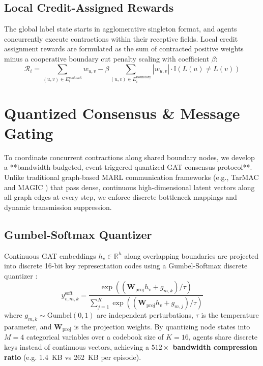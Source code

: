 \documentclass[10pt]{article}
\begin{document}
\subsection{Local Credit-Assigned Rewards}
The global label state starts in agglomerative singleton format, and agents concurrently execute contractions within their receptive fields. Local credit assignment rewards are formulated as the sum of contracted positive weights minus a cooperative boundary cut penalty scaling with coefficient $\beta$:
\begin{equation}
\mathcal{R}_i = \sum_{(u, v) \in E_i^{\text{contract}}} w_{u, v} - \beta \sum_{(u, v) \in E_i^{\text{boundary}}} |w_{u, v}| \cdot \mathbb{I}(L(u) \neq L(v))
\end{equation}

\section{Quantized Consensus \& Message Gating}
To coordinate concurrent contractions along shared boundary nodes, we develop a **bandwidth-budgeted, event-triggered quantized GAT consensus protocol**. Unlike traditional graph-based MARL communication frameworks (e.g., TarMAC \citep{tarmac} and MAGIC \citep{magic}) that pass dense, continuous high-dimensional latent vectors along all graph edges at every step, we enforce discrete bottleneck mappings and dynamic transmission suppression.

\subsection{Gumbel-Softmax Quantizer}
Continuous GAT embeddings $h_v \in \mathbb{R}^h$ along overlapping boundaries are projected into discrete 16-bit key representation codes using a Gumbel-Softmax discrete quantizer \citep{jang2016gumbel}:
\begin{equation}
y^{\text{soft}}_{v, m, k} = \frac{\exp((\mathbf{W}_{\text{proj}} h_v + g_{m, k}) / \tau)}{\sum_{j=1}^K \exp((\mathbf{W}_{\text{proj}} h_v + g_{m, j}) / \tau)}
\end{equation}
where $g_{m, k} \sim \text{Gumbel}(0, 1)$ are independent perturbations, $\tau$ is the temperature parameter, and $\mathbf{W}_{\text{proj}}$ is the projection weights. By quantizing node states into $M=4$ categorical variables over a codebook size of $K=16$, agents share discrete keys instead of continuous vectors, achieving a \textbf{\(512\times\) bandwidth compression ratio} (e.g. 1.4~KB vs 262~KB per episode).
\end{document}
